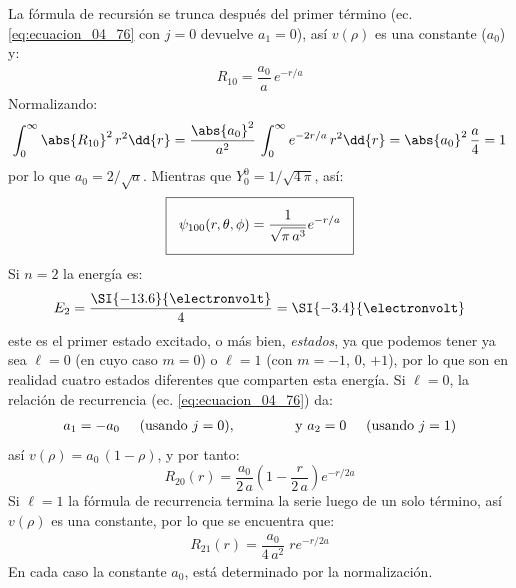 La fórmula de recursión se trunca después del primer término (ec. \ref{eq:ecuacion_04_76} con $j=0$ devuelve $a_{1} = 0$), así $v(\rho)$ es una constante ($a_{0}$) y:
\begin{align}
R_{10} = \dfrac{a_{0}}{a} \, e^{-r/a}
\label{eq:ecuacion_04_79}
\end{align}
Normalizando:
\begin{align*}
\int_{0}^{\infty} \abs{R_{10}}^{2} \, r^{2} \dd{r} = \dfrac{\abs{a_{0}}^{2}}{a^{2}} \, \int_{0}^{\infty} e^{-2r/a} \, r^{2} \dd{r} =  \abs{a_{0}}^{2} \, \dfrac{a}{4} =  1
\end{align*}
por lo que $a_{0} = 2 / \sqrt{a}$. Mientras que $Y_{0}^{0} = 1 / \sqrt{4 \, \pi}$, así:
\begin{align}
\setlength{\fboxsep}{3\fboxsep}\boxed{
\psi_{100} (r, \theta, \phi) = \dfrac{1}{\sqrt{\pi \, a^{3}}} e^{-r/a}}
\label{eq:ecuacion_04_80}
\end{align}
Si $n = 2$ la energía es:
\begin{align}
E_{2} = \dfrac{\SI{-13.6}{\electronvolt}}{4} =  \SI{- 3.4}{\electronvolt}
\label{eq:ecuacion_04_81}
\end{align}
este es el primer estado excitado, o más bien, \textit{estados}, ya que podemos tener ya sea $\ell = 0$ (en cuyo caso $m = 0$) o $\ell = 1$ (con $m = -1$, $0$, $+ 1$), por lo que son en realidad cuatro estados diferentes que comparten esta energía. Si $\ell = 0$, la relación de recurrencia (ec. \ref{eq:ecuacion_04_76}) da:
\begin{align*}
a_{1} = - a_{0} \hspace{0.5cm} \text{(usando } j = 0 \text{)}, \hspace{1.5cm} \text{y } a_{2} = 0 \hspace{0.5cm} \text{(usando } j = 1 \text{)}
\end{align*}
así $v(\rho) = a_{0} \, (1 - \rho)$, y por tanto:
\begin{equation}
R_{20}(r) = \dfrac{a_{0}}{2 \, a} \left(1 - \dfrac{r}{2 \, a} \right) e^{-r/2a}
\label{eq:ecuacion_04_82}
\end{equation}
Si $\ell = 1$ la fórmula de recurrencia termina la serie luego de un solo término, así $v(\rho)$ es una constante, por lo que se encuentra que:
\begin{align}
R_{21}(r) = \dfrac{a_{0}}{4 \, a^{2}} \; r e^{-r/2a}
\label{eq:ecuacion_04_83}
\end{align}
En cada caso la constante $a_{0}$, está determinado por la normalización.
\par
